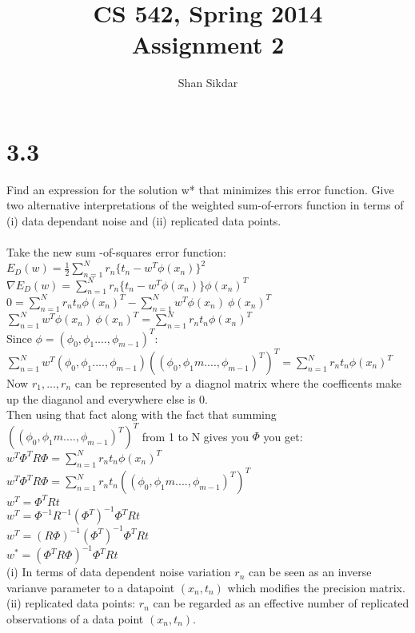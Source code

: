 \documentclass[11pt,leqno,fleqn]{article}
\title{CS 542, Spring 2014
       \\[1ex]
       \textbf{Assignment 2}}
\author{Shan Sikdar}
\date{} %
\begin{document}
\maketitle



\section{ 3.3 }
Find an expression for the solution w* that minimizes this error function.  Give two alternative interpretations of the weighted sum-of-errors function in terms of (i) data dependant noise and (ii) replicated data points.\\
\\
Take the new sum -of-squares error function:\\
$E_D(w) = \frac{1}{2} \sum_{n = 1}^N r_n \{ t_n - w^T \phi (x_n)\}^2$\\
$\nabla E_D(w) = \sum_{n = 1}^N r_n \{ t_n - w^T \phi (x_n)\} \phi (x_n)^T$\\
$ 0 = \sum_{n = 1}^N r_n  t_n \phi (x_n)^T -  \sum_{n = 1}^Nw^T \phi (x_n)\ \phi (x_n)^T$\\
$\sum_{n = 1}^Nw^T \phi (x_n)\ \phi (x_n)^T = \sum_{n = 1}^N r_n  t_n \phi (x_n)^T $\\
Since $\phi = (\phi_0, \phi_1 ...., \phi_{m-1})^T$:\\
$\sum_{n = 1}^Nw^T (\phi_0, \phi_1 ...., \phi_{m-1}) ((\phi_0, \phi_1m ...., \phi_{m-1})^T)^T = \sum_{n = 1}^N r_n  t_n \phi (x_n)^T $\\
Now $r_1,...,r_n$ can be represented by a diagnol matrix where the coefficents make up the diaganol and everywhere else is 0.\\
Then using that fact along with the fact that summing $((\phi_0, \phi_1m ...., \phi_{m-1})^T)^T$ from 1 to N gives you $\Phi$ you get:\\
$w^T \Phi^T R \Phi = \sum_{n = 1}^N r_n  t_n \phi (x_n)^T $\\
$w^T \Phi^T R \Phi = \sum_{n = 1}^N r_n  t_n ((\phi_0, \phi_1m ...., \phi_{m-1})^T)^T$\\
$w^T  = \Phi^T R t$\\
$w^T = \Phi^{-1} R^{-1}(\Phi^T)^{-1}\Phi^T R t$\\
$w^T = (R \Phi)^{-1}(\Phi^T)^{-1}\Phi^T R t$\\
$w^* =(\Phi^T R \Phi)^{-1}\Phi^T R t$\\
(i) In terms of data dependent noise variation $r_n$ can be seen as an inverse varianve parameter to a datapoint $(x_n, t_n)$ which modifies the precision matrix.\\
(ii) replicated data points: $r_n$ can be regarded as an effective number of replicated observations of a data point $(x_n, t_n)$.\\
\end{document}
